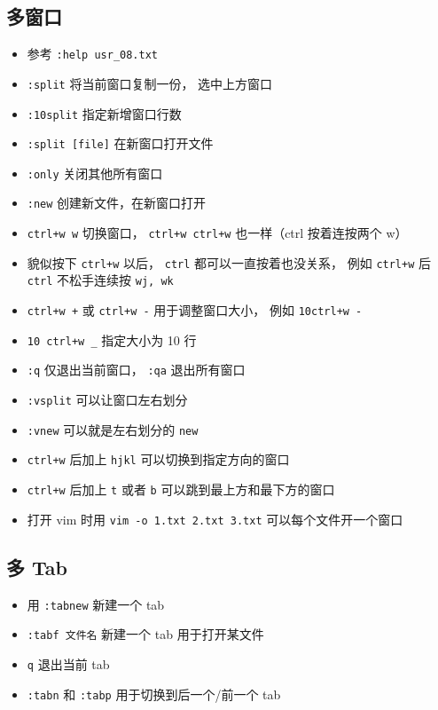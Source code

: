 \subsection{多窗口}
\begin{itemize}
\item 参考 \verb`:help usr_08.txt`
\item \verb`:split` 将当前窗口复制一份， 选中上方窗口
\item \verb`:10split` 指定新增窗口行数
\item \verb`:split [file]` 在新窗口打开文件
\item \verb`:only` 关闭其他所有窗口
\item \verb`:new` 创建新文件，在新窗口打开
\item \verb`ctrl+w w` 切换窗口， \verb`ctrl+w ctrl+w` 也一样（ctrl 按着连按两个 w）
\item 貌似按下 \verb`ctrl+w` 以后， \verb`ctrl` 都可以一直按着也没关系， 例如 \verb`ctrl+w` 后 \verb`ctrl` 不松手连续按 \verb`wj, wk`
\item \verb`ctrl+w +` 或 \verb`ctrl+w -` 用于调整窗口大小， 例如 \verb`10ctrl+w -`
\item \verb`10 ctrl+w _` 指定大小为 10 行
\item \verb`:q` 仅退出当前窗口， \verb`:qa` 退出所有窗口
\item \verb`:vsplit` 可以让窗口左右划分
\item \verb`:vnew` 可以就是左右划分的 \verb`new`
\item \verb`ctrl+w` 后加上 \verb`hjkl` 可以切换到指定方向的窗口
\item \verb`ctrl+w` 后加上 \verb`t` 或者 \verb`b` 可以跳到最上方和最下方的窗口
\item 打开 vim 时用 \verb`vim -o 1.txt 2.txt 3.txt` 可以每个文件开一个窗口
\end{itemize}

\subsection{多 Tab}
\begin{itemize}
\item 用 \verb`:tabnew` 新建一个 tab
\item \verb`:tabf 文件名` 新建一个 tab 用于打开某文件
\item \verb`q` 退出当前 tab
\item \verb`:tabn` 和 \verb`:tabp` 用于切换到后一个/前一个 tab
\end{itemize}

